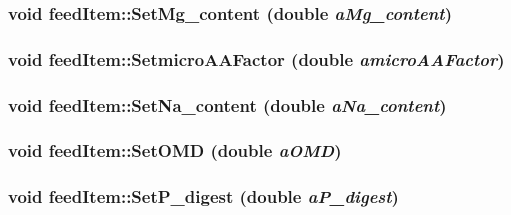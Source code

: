 \label{classfeed_item_a460189522e05438ac2c087df40434cd5}
\hypertarget{classfeed_item_a95db87077d1b12a093660122ce24fabc}{
\subsubsection[{SetMg\_\-content}]{\setlength{\rightskip}{0pt plus 5cm}void feedItem::SetMg\_\-content (double {\em aMg\_\-content})}}
\label{classfeed_item_a95db87077d1b12a093660122ce24fabc}
\hypertarget{classfeed_item_ab31be1d8bbd2be4fc1b96824e093306e}{
\subsubsection[{SetmicroAAFactor}]{\setlength{\rightskip}{0pt plus 5cm}void feedItem::SetmicroAAFactor (double {\em amicroAAFactor})}}
\label{classfeed_item_ab31be1d8bbd2be4fc1b96824e093306e}
\hypertarget{classfeed_item_af185439c6c0da32fc712bf9a35fda6c9}{
\subsubsection[{SetNa\_\-content}]{\setlength{\rightskip}{0pt plus 5cm}void feedItem::SetNa\_\-content (double {\em aNa\_\-content})}}
\label{classfeed_item_af185439c6c0da32fc712bf9a35fda6c9}
\hypertarget{classfeed_item_a18ed185e5691256001dbe832b2acea08}{
\subsubsection[{SetOMD}]{\setlength{\rightskip}{0pt plus 5cm}void feedItem::SetOMD (double {\em aOMD})}}
\label{classfeed_item_a18ed185e5691256001dbe832b2acea08}
\hypertarget{classfeed_item_a8f08fb0fa5aa998baec8cc09dda96f3e}{
\subsubsection[{SetP\_\-digest}]{\setlength{\rightskip}{0pt plus 5cm}void feedItem::SetP\_\-digest (double {\em aP\_\-digest})}}
